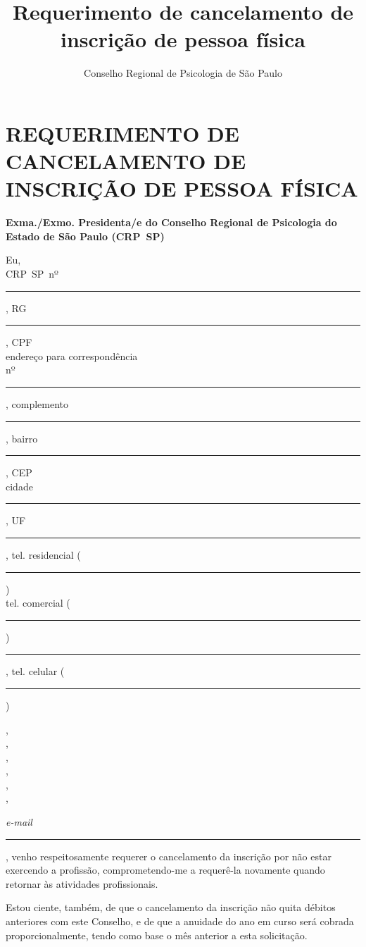 \documentclass[openright, oneside, a4paper, article, brazil]{abntex2}
\title{Requerimento de cancelamento de inscrição de pessoa física}
\author{Conselho Regional de Psicologia de São Paulo}
\begin{document}
\pagestyle{crp}
\vspace*{\baselineskip}
\centering
\Form
\section*{REQUERIMENTO DE CANCELAMENTO DE INSCRIÇÃO DE PESSOA FÍSICA}%
\vspace*{0.618\baselineskip}

\textbf{Exma./Exmo. Presidenta/e do Conselho Regional de Psicologia do Estado de São Paulo (CRP~SP)}
\vspace*{\baselineskip}

\justifying
\noindent
\begin{minipage}[t]{0.995\textwidth}
	Eu, \xrfill[0pt]{0.4pt}\\%
	CRP~SP~nº \rule{8em}{0.4pt} , %
	RG \rule{16em}{0.4pt} , 
	CPF \xrfill[0pt]{0.4pt}\\%
	endereço para correspondência \xrfill[0pt]{0.4pt}\\%
	nº \rule{3em}{0.4pt} , %
	complemento \rule{4em}{0.4pt} , %
	bairro \rule{18em}{0.4pt} , %
	CEP \xrfill[0pt]{0.4pt}\\
	cidade \rule{16em}{0.4pt} , %
	UF \rule{3em}{0.4pt} , %
	tel. residencial ( \rule{1.5em}{0.4pt} ) \xrfill[0pt]{0.4pt}\\%
	tel. comercial ( \rule{1.5em}{0.4pt} ) \rule{16em}{0.4pt} , %
	tel. celular ( \rule{1.5em}{0.4pt} ) \xrfill[0pt]{0.4pt}\\%
	\vspace{\dp0}%
\end{minipage}%
\begin{minipage}[t]{0.005\textwidth}
	\raggedleft
	,\\
	,\\
	,\\
	,\\
	,\\
	,\\
\end{minipage}
%

\vspace{-0.37\baselineskip}
\noindent \textit{e-mail} \rule{20em}{0.4pt} , venho respeitosamente requerer o cancelamento da inscrição por não estar exercendo a profissão, com\-pro\-me\-ten\-do-me a requerê-la novamente quando retornar às atividades profissionais.

Estou ciente, também, de que o cancelamento da inscrição não quita débitos anteriores com este Conselho, e de que a anuidade do ano em curso será cobrada proporcionalmente, tendo como base o mês anterior a esta solicitação.
\end{document}
